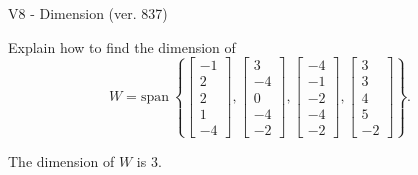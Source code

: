 \begin{exercise}
  \begin{exerciseTitle}V8 - Dimension (ver. 837)\end{exerciseTitle}
  \begin{exerciseStatement}
    Explain how to find the dimension of 
\[W=\mathrm{span}\ \left\{\left[\begin{array}{r}
-1 \\
2 \\
2 \\
1 \\
-4
\end{array}\right] , \left[\begin{array}{r}
3 \\
-4 \\
0 \\
-4 \\
-2
\end{array}\right] , \left[\begin{array}{r}
-4 \\
-1 \\
-2 \\
-4 \\
-2
\end{array}\right] , \left[\begin{array}{r}
3 \\
3 \\
4 \\
5 \\
-2
\end{array}\right]\right\}.\]



  \end{exerciseStatement}
  \begin{exerciseAnswer}
   The dimension of \(W\) is  \(3\).
  


  \end{exerciseAnswer}
\end{exercise}